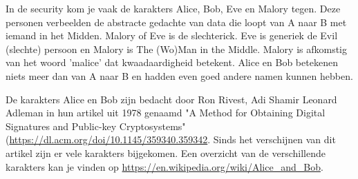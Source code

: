 In de security kom je vaak de karakters Alice, Bob, Eve en Malory tegen. Deze personen verbeelden de abstracte gedachte van data die loopt van A naar B met iemand in het Midden. Malory of Eve is de slechterick. Eve is generiek de Evil (slechte) persoon en Malory is The (Wo)Man in the Middle. Malory is afkomstig van het woord 'malice' dat kwaadaardigheid betekent. Alice en Bob betekenen niets meer dan van A naar B en hadden even goed andere namen kunnen hebben.

De karakters Alice en Bob zijn bedacht door Ron Rivest, Adi Shamir Leonard Adleman in hun artikel uit 1978 genaamd "A Method for Obtaining Digital Signatures and Public-key Cryptosystems" (\url{https://dl.acm.org/doi/10.1145/359340.359342}. Sinds het verschijnen van dit artikel zijn er vele karakters bijgekomen. Een overzicht van de verschillende karakters kan je vinden op \url{https://en.wikipedia.org/wiki/Alice_and_Bob}.
